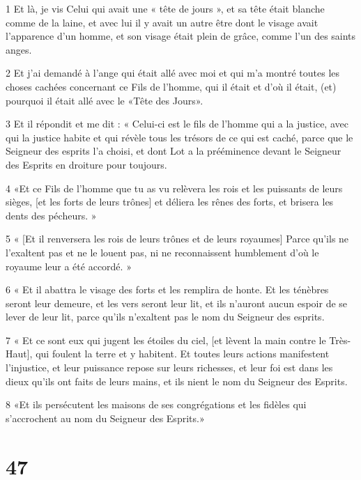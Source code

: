\par 1 Et là, je vis Celui qui avait une « tête de jours », et sa tête était blanche comme de la laine, et avec lui il y avait un autre être dont le visage avait l'apparence d'un homme, et son visage était plein de grâce, comme l'un des saints anges.
\par 2 Et j'ai demandé à l'ange qui était allé avec moi et qui m'a montré toutes les choses cachées concernant ce Fils de l'homme, qui il était et d'où il était, (et) pourquoi il était allé avec le «Tête des Jours».
\par 3 Et il répondit et me dit : « Celui-ci est le fils de l'homme qui a la justice, avec qui la justice habite et qui révèle tous les trésors de ce qui est caché, parce que le Seigneur des esprits l'a choisi, et dont Lot a la prééminence devant le Seigneur des Esprits en droiture pour toujours.
\par 4 «Et ce Fils de l'homme que tu as vu relèvera les rois et les puissants de leurs sièges, [et les forts de leurs trônes] et déliera les rênes des forts, et brisera les dents des pécheurs. »
\par 5 « [Et il renversera les rois de leurs trônes et de leurs royaumes] Parce qu'ils ne l'exaltent pas et ne le louent pas, ni ne reconnaissent humblement d'où le royaume leur a été accordé. »
\par 6 « Et il abattra le visage des forts et les remplira de honte. Et les ténèbres seront leur demeure, et les vers seront leur lit, et ils n'auront aucun espoir de se lever de leur lit, parce qu'ils n'exaltent pas le nom du Seigneur des esprits.
\par 7 « Et ce sont eux qui jugent les étoiles du ciel, [et lèvent la main contre le Très-Haut], qui foulent la terre et y habitent. Et toutes leurs actions manifestent l'injustice, et leur puissance repose sur leurs richesses, et leur foi est dans les dieux qu'ils ont faits de leurs mains, et ils nient le nom du Seigneur des Esprits.
\par 8 «Et ils persécutent les maisons de ses congrégations et les fidèles qui s'accrochent au nom du Seigneur des Esprits.»

\chapter{47}

